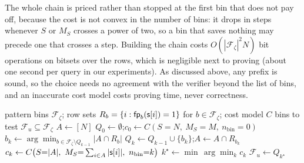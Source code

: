 The whole chain is priced rather than stopped at the first bin that does not pay off, because the cost is not convex in the number of bins: it drops in steps whenever $S$ or $M_S$ crosses a power of two, so a bin that saves nothing may precede one that crosses a step. Building the chain costs $O(|\mathcal{F}_\zeta|^2 N)$ bit operations on bitsets over the rows, which is negligible next to proving (about one second per query in our experiments). As discussed above, any prefix is sound, so the choice needs no agreement with the verifier beyond the list of bins, and an inaccurate cost model costs proving time, never correctness.

\begin{algorithm}[t]
\caption{Greedy bin assignment for pattern $\zeta$ over column $\strcol$.}
\label{alg:greedy-bins}
\begin{algorithmic}[1]
\Require pattern bins $\mathcal{F}_\zeta$; row sets $R_b = \{i : \mathsf{fp}_b(\mathsf{s}[i]) = 1\}$ for $b \in \mathcal{F}_\zeta$; cost model $C$
\Ensure bins to test $\mathcal{F}_u \subseteq \mathcal{F}_\zeta$
\State $A \gets [N]$ 
\State $Q_0 \gets \emptyset$;\quad $c_0 \gets C(S{=}N,\ M_S{=}M,\ n_{\mathrm{bin}}{=}0)$ 
  \State $b_k \gets \arg\min_{b \in \mathcal{F}_\zeta \setminus Q_{k-1}} |A \cap R_b|$ 
  \State $Q_k \gets Q_{k-1} \cup \{b_k\}$;\quad $A \gets A \cap R_{b_k}$
  \State $c_k \gets C\bigl(S{=}|A|,\ M_S{=}\textstyle\sum_{i \in A} |\strcol[i]|,\ n_{\mathrm{bin}}{=}k\bigr)$
\EndFor
\State $k^\star \gets \min\, \arg\min_{k} c_k$ 
\State \Return $\mathcal{F}_u \gets Q_{k^\star}$
\end{algorithmic}
\end{algorithm}
